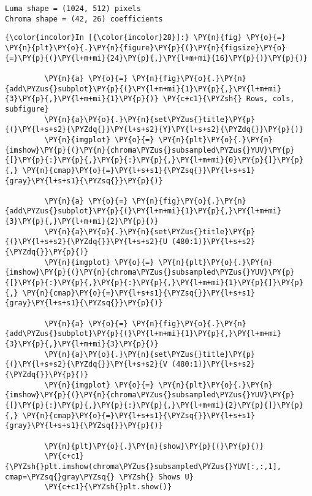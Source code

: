     \begin{Verbatim}[commandchars=\\\{\}]
Luma shape = (1024, 512) pixels
Chroma shape = (42, 26) coefficients

    \end{Verbatim}

    \begin{Verbatim}[commandchars=\\\{\}]
{\color{incolor}In [{\color{incolor}28}]:} \PY{n}{fig} \PY{o}{=} \PY{n}{plt}\PY{o}{.}\PY{n}{figure}\PY{p}{(}\PY{n}{figsize}\PY{o}{=}\PY{p}{(}\PY{l+m+mi}{24}\PY{p}{,}\PY{l+m+mi}{16}\PY{p}{)}\PY{p}{)}
         
         \PY{n}{a} \PY{o}{=} \PY{n}{fig}\PY{o}{.}\PY{n}{add\PYZus{}subplot}\PY{p}{(}\PY{l+m+mi}{1}\PY{p}{,}\PY{l+m+mi}{3}\PY{p}{,}\PY{l+m+mi}{1}\PY{p}{)} \PY{c+c1}{\PYZsh{} Rows, cols, subfigure}
         \PY{n}{a}\PY{o}{.}\PY{n}{set\PYZus{}title}\PY{p}{(}\PY{l+s+s2}{\PYZdq{}}\PY{l+s+s2}{Y}\PY{l+s+s2}{\PYZdq{}}\PY{p}{)}
         \PY{n}{imgplot} \PY{o}{=} \PY{n}{plt}\PY{o}{.}\PY{n}{imshow}\PY{p}{(}\PY{n}{chroma\PYZus{}subsampled\PYZus{}YUV}\PY{p}{[}\PY{p}{:}\PY{p}{,}\PY{p}{:}\PY{p}{,}\PY{l+m+mi}{0}\PY{p}{]}\PY{p}{,} \PY{n}{cmap}\PY{o}{=}\PY{l+s+s1}{\PYZsq{}}\PY{l+s+s1}{gray}\PY{l+s+s1}{\PYZsq{}}\PY{p}{)}
         
         \PY{n}{a} \PY{o}{=} \PY{n}{fig}\PY{o}{.}\PY{n}{add\PYZus{}subplot}\PY{p}{(}\PY{l+m+mi}{1}\PY{p}{,}\PY{l+m+mi}{3}\PY{p}{,}\PY{l+m+mi}{2}\PY{p}{)}
         \PY{n}{a}\PY{o}{.}\PY{n}{set\PYZus{}title}\PY{p}{(}\PY{l+s+s2}{\PYZdq{}}\PY{l+s+s2}{U (480:1)}\PY{l+s+s2}{\PYZdq{}}\PY{p}{)}
         \PY{n}{imgplot} \PY{o}{=} \PY{n}{plt}\PY{o}{.}\PY{n}{imshow}\PY{p}{(}\PY{n}{chroma\PYZus{}subsampled\PYZus{}YUV}\PY{p}{[}\PY{p}{:}\PY{p}{,}\PY{p}{:}\PY{p}{,}\PY{l+m+mi}{1}\PY{p}{]}\PY{p}{,} \PY{n}{cmap}\PY{o}{=}\PY{l+s+s1}{\PYZsq{}}\PY{l+s+s1}{gray}\PY{l+s+s1}{\PYZsq{}}\PY{p}{)}
         
         \PY{n}{a} \PY{o}{=} \PY{n}{fig}\PY{o}{.}\PY{n}{add\PYZus{}subplot}\PY{p}{(}\PY{l+m+mi}{1}\PY{p}{,}\PY{l+m+mi}{3}\PY{p}{,}\PY{l+m+mi}{3}\PY{p}{)}
         \PY{n}{a}\PY{o}{.}\PY{n}{set\PYZus{}title}\PY{p}{(}\PY{l+s+s2}{\PYZdq{}}\PY{l+s+s2}{V (480:1)}\PY{l+s+s2}{\PYZdq{}}\PY{p}{)}
         \PY{n}{imgplot} \PY{o}{=} \PY{n}{plt}\PY{o}{.}\PY{n}{imshow}\PY{p}{(}\PY{n}{chroma\PYZus{}subsampled\PYZus{}YUV}\PY{p}{[}\PY{p}{:}\PY{p}{,}\PY{p}{:}\PY{p}{,}\PY{l+m+mi}{2}\PY{p}{]}\PY{p}{,} \PY{n}{cmap}\PY{o}{=}\PY{l+s+s1}{\PYZsq{}}\PY{l+s+s1}{gray}\PY{l+s+s1}{\PYZsq{}}\PY{p}{)}
         
         \PY{n}{plt}\PY{o}{.}\PY{n}{show}\PY{p}{(}\PY{p}{)}
         \PY{c+c1}{\PYZsh{}plt.imshow(chroma\PYZus{}subsampled\PYZus{}YUV[:,:,1], cmap=\PYZsq{}gray\PYZsq{} \PYZsh{} Shows U}
         \PY{c+c1}{\PYZsh{}plt.show()}
\end{Verbatim}



